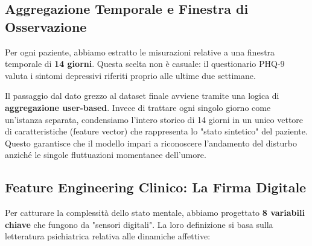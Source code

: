 \subsection{Aggregazione Temporale e Finestra di Osservazione}
\label{subsec:windowing_depression}

Per ogni paziente, abbiamo estratto le misurazioni relative a una finestra temporale di \textbf{14 giorni}. Questa scelta non è casuale: il questionario PHQ-9 valuta i sintomi depressivi riferiti proprio alle ultime due settimane. 

Il passaggio dal dato grezzo al dataset finale avviene tramite una logica di \textbf{aggregazione user-based}. Invece di trattare ogni singolo giorno come un'istanza separata, condensiamo l'intero storico di 14 giorni in un unico vettore di caratteristiche (feature vector) che rappresenta lo "stato sintetico" del paziente. Questo garantisce che il modello impari a riconoscere l'andamento del disturbo anziché le singole fluttuazioni momentanee dell'umore.

\subsection{Feature Engineering Clinico: La Firma Digitale}
\label{subsec:feature_eng_depression}

Per catturare la complessità dello stato mentale, abbiamo progettato \textbf{8 variabili chiave} che fungono da "sensori digitali". La loro definizione si basa sulla letteratura psichiatrica relativa alle dinamiche affettive:

